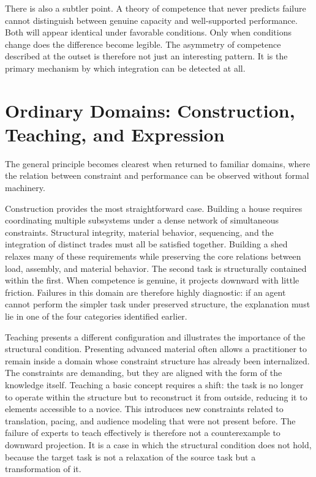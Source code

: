 \documentclass[12pt, a4paper]{article}
\begin{document}
There is also a subtler point. A theory of competence that never predicts failure cannot distinguish between genuine capacity and well-supported performance. Both will appear identical under favorable conditions. Only when conditions change does the difference become legible. The asymmetry of competence described at the outset is therefore not just an interesting pattern. It is the primary mechanism by which integration can be detected at all.

\section{Ordinary Domains: Construction, Teaching, and Expression}

The general principle becomes clearest when returned to familiar domains, where the relation between constraint and performance can be observed without formal machinery.

Construction provides the most straightforward case. Building a house requires coordinating multiple subsystems under a dense network of simultaneous constraints. Structural integrity, material behavior, sequencing, and the integration of distinct trades must all be satisfied together. Building a shed relaxes many of these requirements while preserving the core relations between load, assembly, and material behavior. The second task is structurally contained within the first. When competence is genuine, it projects downward with little friction. Failures in this domain are therefore highly diagnostic: if an agent cannot perform the simpler task under preserved structure, the explanation must lie in one of the four categories identified earlier.

Teaching presents a different configuration and illustrates the importance of the structural condition. Presenting advanced material often allows a practitioner to remain inside a domain whose constraint structure has already been internalized. The constraints are demanding, but they are aligned with the form of the knowledge itself. Teaching a basic concept requires a shift: the task is no longer to operate within the structure but to reconstruct it from outside, reducing it to elements accessible to a novice. This introduces new constraints related to translation, pacing, and audience modeling that were not present before. The failure of experts to teach effectively is therefore not a counterexample to downward projection. It is a case in which the structural condition does not hold, because the target task is not a relaxation of the source task but a transformation of it.
\end{document}
